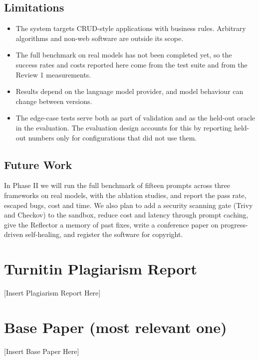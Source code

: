 \documentclass[12pt,a4paper]{report}
\begin{document}
\section{Limitations}

\begin{itemize}
    \item The system targets CRUD-style applications with business rules. Arbitrary algorithms and non-web software are outside its scope.
    \item The full benchmark on real models has not been completed yet, so the success rates and costs reported here come from the test suite and from the Review 1 measurements.
    \item Results depend on the language model provider, and model behaviour can change between versions.
    \item The edge-case tests serve both as part of validation and as the held-out oracle in the evaluation. The evaluation design accounts for this by reporting held-out numbers only for configurations that did not use them.
\end{itemize}

\section{Future Work}

In Phase II we will run the full benchmark of fifteen prompts across three frameworks on real models, with the ablation studies, and report the pass rate, escaped bugs, cost and time. We also plan to add a security scanning gate (Trivy and Checkov) to the sandbox, reduce cost and latency through prompt caching, give the Reflector a memory of past fixes, write a conference paper on progress-driven self-healing, and register the software for copyright.

\singlespacing



\appendix
\chapter{Turnitin Plagiarism Report}
[Insert Plagiarism Report Here]

\chapter{Base Paper (most relevant one)}
[Insert Base Paper Here]
\end{document}
